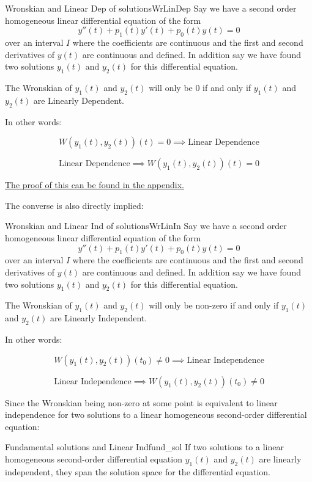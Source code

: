 \documentclass{report}
\begin{document}
\begin{mytheo}{Wronskian and Linear Dep of solutions}{WrLinDep}
    Say we have a second order homogeneous linear differential equation of the form 
    $$y''(t) + p_1(t)y'(t) + p_0(t)y(t) = 0$$
    over an interval $I$ where the coefficients are continuous and the first and second derivatives of $y(t)$ are continuous and defined. 
    In addition say we have found two solutions $y_1(t)$ and $y_2(t)$ for this differential equation.
    
    The Wronskian of $y_1(t)$ and $y_2(t)$ will only be 0 if and only if $y_1(t)$ and $y_2(t)$ are Linearly Dependent. 
    
    In other words:
    
    $$W(y_1(t), y_2(t))(t) = 0 \implies \text{Linear Dependence}$$
    
    $$ \text{Linear Dependence} \implies W(y_1(t), y_2(t))(t) = 0$$
    
\end{mytheo}


\hyperref[sec:PrWrLinDep]{The proof of this can be found in the appendix.}

The converse is also directly implied:

\begin{mytheo}{Wronskian and Linear Ind of solutions}{WrLinIn}
    Say we have a second order homogeneous linear differential equation of the form 
    $$y''(t) + p_1(t)y'(t) + p_0(t)y(t) = 0$$
    over an interval $I$ where the coefficients are continuous and the first and second derivatives of $y(t)$ are continuous and defined. 
    In addition say we have found two solutions $y_1(t)$ and $y_2(t)$ for this differential equation.
    
    The Wronskian of $y_1(t)$ and $y_2(t)$ will only be non-zero if and only if $y_1(t)$ and $y_2(t)$ are Linearly Independent. 
    
    In other words:
    
    $$W(y_1(t), y_2(t))(t_0) \neq 0 \implies \text{Linear Independence}$$
    
   $$ \text{Linear Independence} \implies W(y_1(t), y_2(t))(t_0) \neq 0$$
    
\end{mytheo}


Since the Wronskian being non-zero at some point is equivalent to linear independence for two solutions to a linear homogeneous second-order differential equation:

\begin{mytheo}{Fundamental solutions and Linear Ind}{fund_sol}
    If two solutions to a linear homogeneous second-order differential equation $y_1(t)$ and $y_2(t)$ are linearly independent, they span the solution space for the differential equation.
\end{mytheo}
\end{document}
